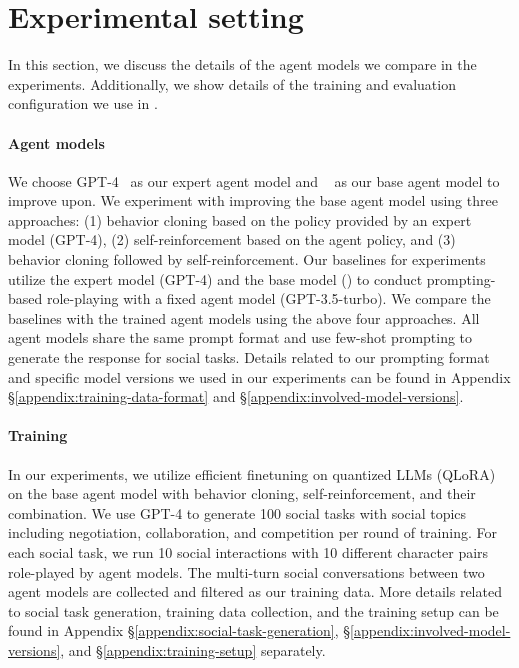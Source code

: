 \section{Experimental setting}
\label{sec:experiments}
In this section, we discuss the details of the agent models we compare in the experiments. Additionally, we show details of the training and evaluation configuration we use in \model.

\paragraph{Agent models} We choose GPT-4~\citep{openai2023gpt4} as our expert agent model and  \mistral~\citep{jiang2023mistral} as our base agent model to improve upon. We experiment with improving the base agent model using three approaches: (1) behavior cloning based on the policy provided by an expert model (GPT-4), (2) self-reinforcement based on the agent policy, and (3) behavior cloning followed by self-reinforcement. Our baselines for experiments utilize the expert model (GPT-4) and the base model (\mistral) to conduct prompting-based role-playing with a fixed agent model (GPT-3.5-turbo). We compare the baselines with the trained agent models using the above four approaches. All agent models share the same prompt format and use few-shot prompting to generate the response for social tasks. Details related to our prompting format and specific model versions we used in our experiments can be found in Appendix  
 \S\ref{appendix:training-data-format} and \S\ref{appendix:involved-model-versions}.

\paragraph{Training} In our experiments, we utilize efficient finetuning on quantized LLMs (QLoRA)~\citep{dettmers2023qlora} on the base agent model \mistral with behavior cloning, self-reinforcement, and their combination. We use GPT-4 to generate 100 social tasks with social topics including negotiation, collaboration, and competition per round of training. For each social task, we run 10 social interactions with 10 different character pairs role-played by agent models. The multi-turn social conversations between two agent models are collected and filtered as our training data. More details related to social task generation, training data collection, and the training setup can be found in Appendix \S\ref{appendix:social-task-generation}, \S\ref{appendix:involved-model-versions}, and \S\ref{appendix:training-setup} separately.

